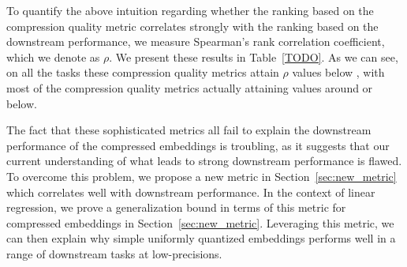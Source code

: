 To quantify the above intuition regarding whether the ranking based on the compression quality metric correlates strongly with the ranking based on the downstream performance, we measure Spearman's rank correlation coefficient, which we denote as $\rho$.
We present these results in Table~\ref{TODO}.
As we can see, on all the tasks these compression quality metrics attain $\rho$ values below , with most of the compression quality metrics actually attaining values around  or below.

The fact that these sophisticated metrics all fail to explain the downstream performance of the compressed embeddings is troubling, as it suggests that our current understanding of what leads to strong downstream performance is flawed.
To overcome this problem, we propose a new metric in Section~\ref{sec:new_metric} which correlates well with downstream performance. In the context of linear regression, we prove a generalization bound in terms of this metric for compressed embeddings in Section~\ref{sec:new_metric}.
Leveraging this metric, we can then explain why simple uniformly quantized embeddings performs well in a range of downstream tasks at low-precisions.



